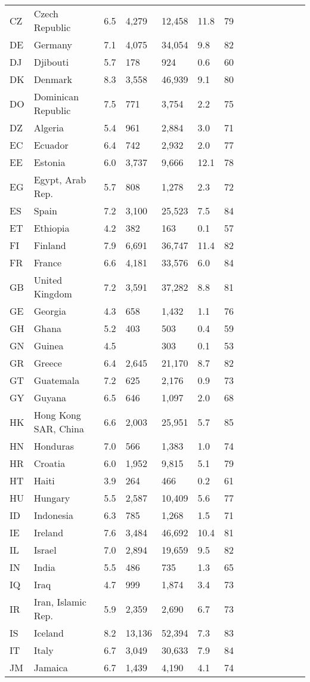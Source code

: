 \begin{scriptsize}
\begin{center}
\begin{longtable}{llllllllllllll}
CZ&Czech Republic&6.5&4,279&12,458&11.8&79\\
DE&Germany&7.1&4,075&34,054&9.8&82\\
DJ&Djibouti&5.7&178&924&0.6&60\\
DK&Denmark&8.3&3,558&46,939&9.1&80\\
DO&Dominican Republic&7.5&771&3,754&2.2&75\\
DZ&Algeria&5.4&961&2,884&3.0&71\\
EC&Ecuador&6.4&742&2,932&2.0&77\\
EE&Estonia&6.0&3,737&9,666&12.1&78\\
EG&Egypt, Arab Rep.&5.7&808&1,278&2.3&72\\
ES&Spain&7.2&3,100&25,523&7.5&84\\
ET&Ethiopia&4.2&382&163&0.1&57\\
FI&Finland&7.9&6,691&36,747&11.4&82\\
FR&France&6.6&4,181&33,576&6.0&84\\
GB&United Kingdom&7.2&3,591&37,282&8.8&81\\
GE&Georgia&4.3&658&1,432&1.1&76\\
GH&Ghana&5.2&403&503&0.4&59\\
GN&Guinea&4.5&&303&0.1&53\\
GR&Greece&6.4&2,645&21,170&8.7&82\\
GT&Guatemala&7.2&625&2,176&0.9&73\\
GY&Guyana&6.5&646&1,097&2.0&68\\
HK&Hong Kong SAR, China&6.6&2,003&25,951&5.7&85\\
HN&Honduras&7.0&566&1,383&1.0&74\\
HR&Croatia&6.0&1,952&9,815&5.1&79\\
HT&Haiti&3.9&264&466&0.2&61\\
HU&Hungary&5.5&2,587&10,409&5.6&77\\
ID&Indonesia&6.3&785&1,268&1.5&71\\
IE&Ireland&7.6&3,484&46,692&10.4&81\\
IL&Israel&7.0&2,894&19,659&9.5&82\\
IN&India&5.5&486&735&1.3&65\\
IQ&Iraq&4.7&999&1,874&3.4&73\\
IR&Iran, Islamic Rep.&5.9&2,359&2,690&6.7&73\\
IS&Iceland&8.2&13,136&52,394&7.3&83\\
IT&Italy&6.7&3,049&30,633&7.9&84\\
JM&Jamaica&6.7&1,439&4,190&4.1&74\\

\end{longtable}
\end{center}
\end{scriptsize}
